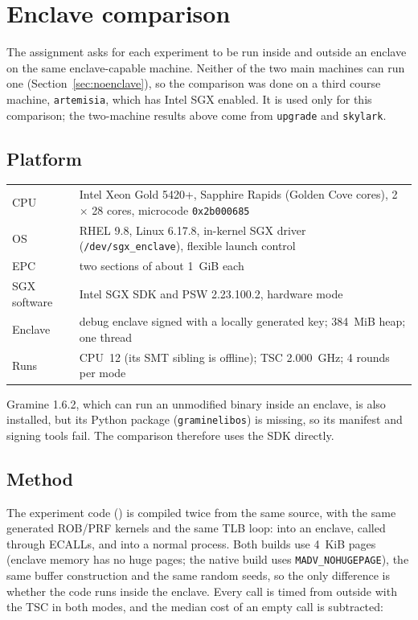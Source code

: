 \documentclass[11pt]{article}
\newcommand{\up}{\texttt{upgrade}}
\newcommand{\sk}{\texttt{skylark}}
\newcommand{\file}[1]{\texttt{\detokenize{#1}}}
\begin{document}
\section{Enclave comparison}
\label{sec:enclave}

The assignment asks for each experiment to be run inside and outside an
enclave on the same enclave-capable machine. Neither of the two main
machines can run one (Section~\ref{sec:noenclave}), so the comparison was
done on a third course machine, \texttt{artemisia}, which has Intel SGX
enabled. It is used only for this comparison; the two-machine results above
come from \up{} and \sk{}.

\subsection{Platform}

\begin{center}
\small
\begin{tabularx}{\linewidth}{@{}lX@{}}
\toprule
CPU & Intel Xeon Gold 5420+, Sapphire Rapids (Golden Cove cores), 2 $\times$ 28 cores, microcode \texttt{0x2b000685} \\
OS & RHEL 9.8, Linux 6.17.8, in-kernel SGX driver (\texttt{/dev/sgx\_enclave}), flexible launch control \\
EPC & two sections of about 1~GiB each \\
SGX software & Intel SGX SDK and PSW 2.23.100.2, hardware mode \\
Enclave & debug enclave signed with a locally generated key; 384~MiB heap; one thread \\
Runs & CPU~12 (its SMT sibling is offline); TSC 2.000~GHz; 4 rounds per mode \\
\bottomrule
\end{tabularx}
\end{center}

Gramine 1.6.2, which can run an unmodified binary inside an enclave, is also
installed, but its Python package (\texttt{graminelibos}) is missing, so its
manifest and signing tools fail. The comparison therefore uses the SDK
directly.

\subsection{Method}

The experiment code (\file{enclave/core.c}) is compiled twice from the same
source, with the same generated ROB/PRF kernels and the same TLB loop: into
an enclave, called through ECALLs, and into a normal process. Both builds use
4~KiB pages (enclave memory has no huge pages; the native build uses
\texttt{MADV\_NOHUGEPAGE}), the same buffer construction and the same random
seeds, so the only difference is whether the code runs inside the enclave.
Every call is timed from outside with the TSC in both modes, and the median
cost of an empty call is subtracted:
\end{document}
